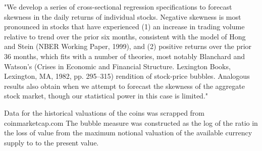 "We develop a series of cross-sectional regression specifications to forecast skewness in the daily returns of individual stocks. Negative skewness is most pronounced in stocks that have experienced (1) an increase in trading volume relative to trend over the prior six months, consistent with the model of Hong and Stein (NBER Working Paper, 1999), and (2) positive returns over the prior 36 months, which fits with a number of theories, most notably Blanchard and Watson's (Crises in Economic and Financial Structure. Lexington Books, Lexington, MA, 1982, pp. 295–315) rendition of stock-price bubbles. Analogous results also obtain when we attempt to forecast the skewness of the aggregate stock market, though our statistical power in this case is limited."






Data for the historical valuations of the coins was scrapped from coinmarketcap.com The bubble measure was constructed as the log of the ratio in the loss of value from the maximum notional valuation of the available currency supply to to the present value. 

